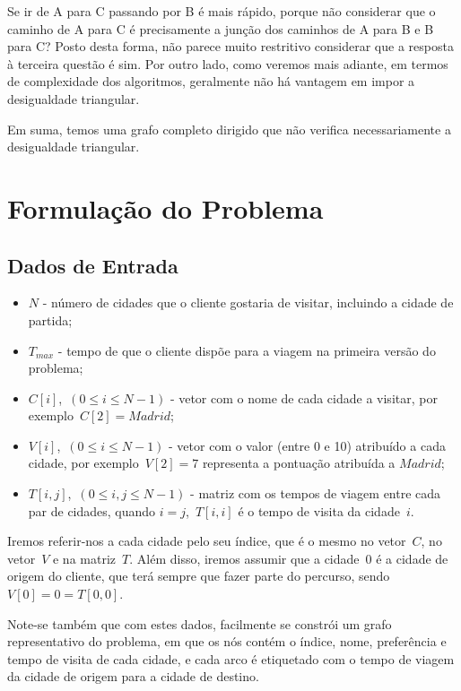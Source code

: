 \documentclass[12pt,a4paper,reqno]{report}
\numberwithin{equation}{section}
\begin{document}
Se ir de A para C passando por B é mais rápido, porque não considerar que o caminho de A para C é precisamente a junção dos caminhos de A para B e B para C? Posto desta forma, não parece muito restritivo considerar que a resposta à terceira questão é sim. Por outro lado, como veremos mais adiante, em termos de complexidade dos algoritmos, geralmente não há vantagem em impor a desigualdade triangular.

Em suma, temos uma grafo completo dirigido que não verifica necessariamente a desigualdade triangular.

\chapter{Formulação do Problema}

\section{Dados de Entrada}

\begin{itemize}
	\item $N$ - número de cidades que o cliente gostaria de visitar, incluindo a cidade de partida;
	\item $T_{max}$ - tempo de que o cliente dispõe para a viagem na primeira versão do problema;
	\item $C[i]$,~$(0 \leq i \leq N-1)$ - vetor com o nome de cada cidade a visitar, por exemplo~$C[2] = Madrid$;
	\item $V[i]$,~$(0 \leq i \leq N-1)$ - vetor com o valor (entre 0 e 10) atribuído a cada cidade, por exemplo~$V[2] = 7$ representa a pontuação atribuída a $Madrid$;
	\item $T[i,j]$,~$(0 \leq i,j \leq N-1)$ - matriz com os tempos de viagem entre cada par de cidades, quando $i = j$,~$T[i,i]$ é o tempo de visita da cidade~$i$.
\end{itemize}

Iremos referir-nos a cada cidade pelo seu índice, que é o mesmo no vetor~$C$, no vetor~$V$ e na matriz~$T$. Além disso, iremos assumir que a cidade~$0$ é a cidade de origem do cliente, que terá sempre que fazer parte do percurso, sendo~$V[0] = 0 = T[0,0]$.

Note-se também que com estes dados, facilmente se constrói um grafo representativo do problema, em que os nós contém o índice, nome, preferência e tempo de visita de cada cidade, e cada arco é etiquetado com o tempo de viagem da cidade de origem para a cidade de destino.
\end{document}
